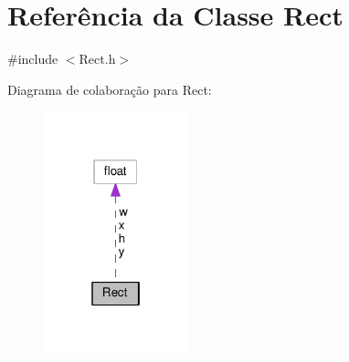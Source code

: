 \hypertarget{classRect}{\section{Referência da Classe Rect}
\label{classRect}
}


{\ttfamily \#include $<$Rect.\+h$>$}



Diagrama de colaboração para Rect\+:
\nopagebreak
\begin{figure}[H]
\begin{center}
\leavevmode
\includegraphics[width=118pt]{classRect__coll__graph}
\end{center}
\end{figure}
